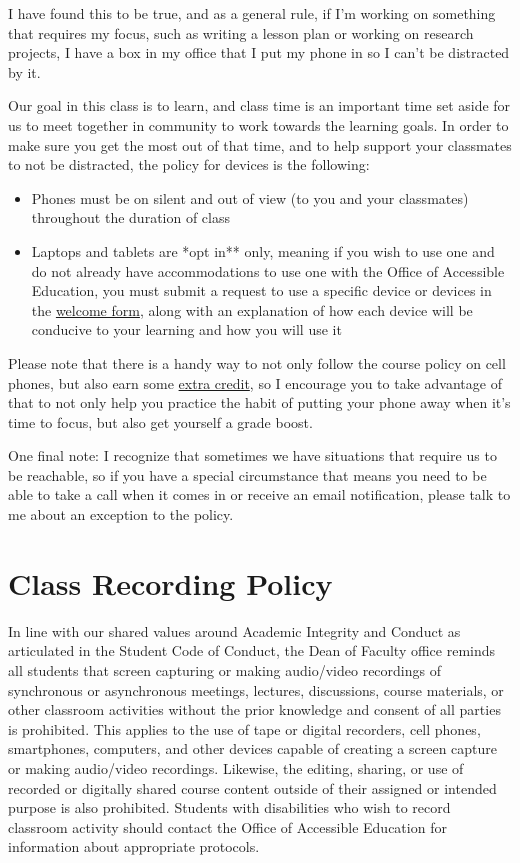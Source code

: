 \documentclass[
  letterpaper,
  DIV=11,
  numbers=noendperiod]{scrartcl}
\providecommand{\tightlist}{%
  \setlength{\itemsep}{0pt}\setlength{\parskip}{0pt}}
\begin{document}
I have found this to be true, and as a general rule, if I'm working on
something that requires my focus, such as writing a lesson plan or
working on research projects, I have a box in my office that I put my
phone in so I can't be distracted by it.

Our goal in this class is to learn, and class time is an important time
set aside for us to meet together in community to work towards the
learning goals. In order to make sure you get the most out of that time,
and to help support your classmates to not be distracted, the policy for
devices is the following:

\begin{itemize}
\tightlist
\item
  Phones must be on silent and out of view (to you and your classmates)
  throughout the duration of class
\item
  Laptops and tablets are *opt in** only, meaning if you wish to use one
  and do not already have accommodations to use one with the Office of
  Accessible Education, you must submit a request to use a specific
  device or devices in the
  \href{https://forms.gle/NUZQSNaDPxXRTite8}{welcome form}, along with
  an explanation of how each device will be conducive to your learning
  and how you will use it
\end{itemize}

Please note that there is a handy way to not only follow the course
policy on cell phones, but also earn some \hyperref[roundup]{extra
credit}, so I encourage you to take advantage of that to not only help
you practice the habit of putting your phone away when it's time to
focus, but also get yourself a grade boost.

One final note: I recognize that sometimes we have situations that
require us to be reachable, so if you have a special circumstance that
means you need to be able to take a call when it comes in or receive an
email notification, please talk to me about an exception to the policy.

\section{Class Recording Policy}\label{recording}

In line with our shared values around Academic Integrity and Conduct as
articulated in the Student Code of Conduct, the Dean of Faculty office
reminds all students that screen capturing or making audio/video
recordings of synchronous or asynchronous meetings, lectures,
discussions, course materials, or other classroom activities without the
prior knowledge and consent of all parties is prohibited. This applies
to the use of tape or digital recorders, cell phones, smartphones,
computers, and other devices capable of creating a screen capture or
making audio/video recordings. Likewise, the editing, sharing, or use of
recorded or digitally shared course content outside of their assigned or
intended purpose is also prohibited. Students with disabilities who wish
to record classroom activity should contact the Office of Accessible
Education for information about appropriate protocols.
\end{document}
